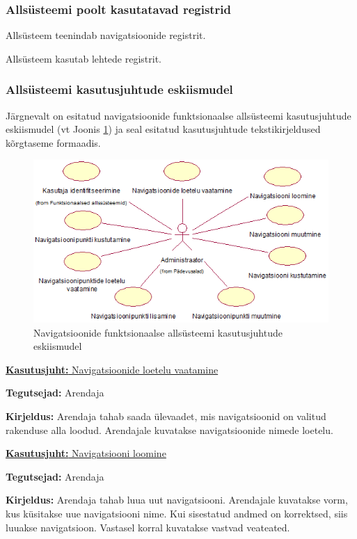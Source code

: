 \documentclass[a4paper,12pt]{article} %
\begin{document}
\subsubsection{Allsüsteemi poolt kasutatavad registrid}
Allsüsteem teenindab navigatsioonide registrit.\par
Allsüsteem kasutab lehtede registrit.
\subsubsection{Allsüsteemi kasutusjuhtude eskiismudel}
Järgnevalt on esitatud navigatsioonide funktsionaalse allsüsteemi kasutusjuhtude eskiismudel (vt Joonis \ref{fig_navigatsioonide_funktsionaalse_allsüsteemi_kasutusjuhtude_eskiismudel}) ja seal esitatud kasutusjuhtude tekstikirjeldused kõrgtaseme formaadis.
\begin{figure}[H]
\begin{center}
\includegraphics[bb=0 0 553 306,scale=1]{./diagrams/navigations-subsystem-use-case-digram.png}
\caption{Navigatsioonide funktsionaalse allsüsteemi kasutusjuhtude eskiismudel}
\label{fig_navigatsioonide_funktsionaalse_allsüsteemi_kasutusjuhtude_eskiismudel}
\end{center}
\end{figure}

\underline{\textbf{Kasutusjuht:} Navigatsioonide loetelu vaatamine}
\par
\textbf{Tegutsejad:} Arendaja
\par
\textbf{Kirjeldus:} Arendaja tahab saada ülevaadet, mis navigatsioonid on valitud rakenduse alla loodud. Arendajale kuvatakse navigatsioonide nimede loetelu.
\par

\underline{\textbf{Kasutusjuht:} Navigatsiooni loomine}
\par
\textbf{Tegutsejad:} Arendaja
\par
\textbf{Kirjeldus:} Arendaja tahab luua uut navigatsiooni. Arendajale kuvatakse vorm, kus küsitakse uue navigatsiooni nime. Kui sisestatud andmed on korrektsed, siis luuakse navigatsioon. Vastasel korral kuvatakse vastvad veateated.
\par
\end{document}
